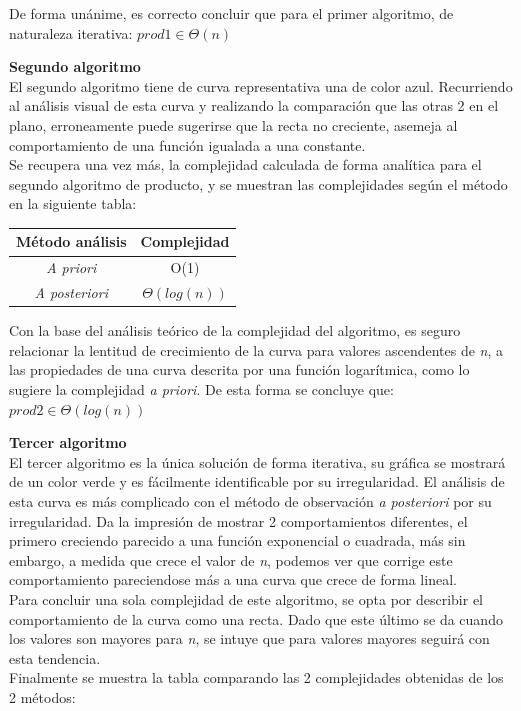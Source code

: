 \documentclass{report}
\begin{document}
                De forma unánime, es correcto concluir que para el primer algoritmo, de naturaleza iterativa: $prod1 \in \Theta(n)$
            
            \hfill \break
            
            \textbf{Segundo algoritmo}\\
                El segundo algoritmo tiene de curva representativa una de color azul. Recurriendo al análisis visual de esta curva y realizando la comparación que las otras 2 en el plano, erroneamente puede sugerirse que la recta no creciente, asemeja al comportamiento de una función igualada a una constante.\\
                Se recupera una vez más, la complejidad calculada de forma analítica para el segundo algoritmo de producto, y se muestran las complejidades según el método en la siguiente tabla:
                
                \begin{table}[h!]
                    \centering
                    \begin{tabular}{c | c}
                        Método análisis & Complejidad \\ \hline
                        \textit{A priori} & O(1)\\
                        \textit{A posteriori} & $\Theta(log(n))$\\
                    \end{tabular}
                \end{table}
                
                Con la base del análisis teórico de la complejidad del algoritmo, es seguro relacionar la lentitud de crecimiento de la curva para valores ascendentes de \textit{n}, a las propiedades de una curva descrita por una función logarítmica, como lo sugiere la complejidad \textit{a priori}.  De esta forma se concluye que: $prod2 \in \Theta(log(n))$
            
            \hfill \break
            
            \textbf{Tercer algoritmo}\\
                El tercer algoritmo es la única solución de forma iterativa, su gráfica se mostrará de un color verde y es fácilmente identificable por su irregularidad. El análisis de esta curva es más complicado con el método de observación \textit{a posteriori} por su irregularidad. Da la impresión de mostrar 2 comportamientos diferentes, el primero creciendo parecido a una función exponencial o cuadrada, más sin embargo, a medida que crece el valor de \textit{n}, podemos ver que corrige este comportamiento pareciendose más a una curva que crece de forma lineal.\\
                Para concluir una sola complejidad de este algoritmo, se opta por describir el comportamiento de la curva como una recta. Dado que este último se da cuando los valores son mayores para \textit{n}, se intuye que para valores mayores seguirá con esta tendencia.\\
                Finalmente se muestra la tabla comparando las 2 complejidades obtenidas de los 2 métodos:
                
\end{document}
